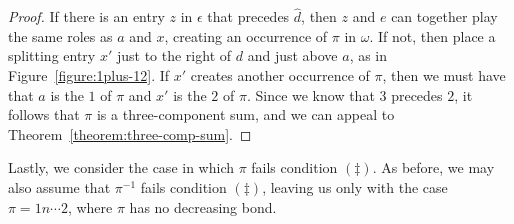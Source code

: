 \documentclass[10pt]{article}
\theoremstyle{plain}
\begin{document}
\begin{proof}
If there is an entry $z$ in $\epsilon$ that precedes $\hat{d}$, then $z$ and $e$ can together play the same roles as $a$ and $x$, creating an occurrence of $\pi$ in $\omega$. If not, then place a splitting entry $x'$ just to the right of $d$ and just above $a$, as in Figure~\ref{figure:1plus-12}. If $x'$ creates another occurrence of $\pi$, then we must have that $a$ is the $1$ of $\pi$ and $x'$ is the $2$ of $\pi$. Since we know that $3$ precedes $2$, it follows that $\pi$ is a three-component sum, and we can appeal to Theorem~\ref{theorem:three-comp-sum}.
\end{proof}

Lastly, we consider the case in which $\pi$ fails condition $(\ddagger)$. As before, we may also assume that $\pi^{-1}$ fails condition $(\ddagger)$, leaving us only with the case $\pi = 1n\cdots 2$, where $\pi$ has no decreasing bond.
\end{document}
